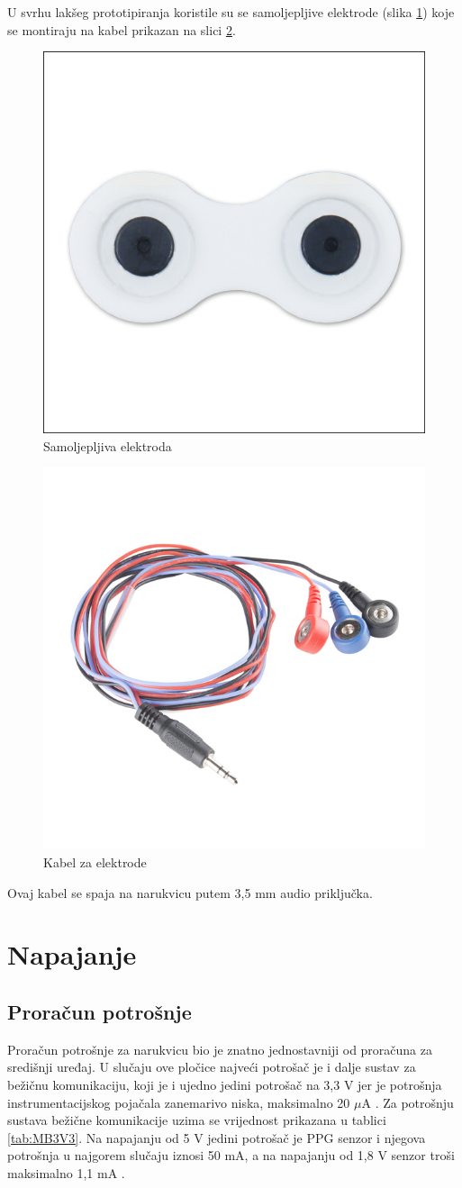 U svrhu lakšeg prototipiranja koristile su se samoljepljive elektrode (slika \ref{slk:ELECTRODE}) koje se montiraju na kabel prikazan na slici \ref{slk:CABLE}. 
\begin{figure}[htb]
    \centering
    \includegraphics[width=6 cm]{Figures/ELECTRODE-BOTTOM.jpg}
    \caption{Samoljepljiva elektroda \cite{electrode}}
    \label{slk:ELECTRODE}
\end{figure}
\begin{figure}
    \centering
    \includegraphics[width=6 cm]{Figures/CABLE.jpg}
    \caption{Kabel za elektrode}
    \label{slk:CABLE}
\end{figure}
Ovaj kabel se spaja na narukvicu putem 3,5 mm audio priključka.

\section{Napajanje}
\subsection{Proračun potrošnje}

Proračun potrošnje za narukvicu bio je znatno jednostavniji od proračuna za središnji uređaj. U slučaju ove pločice najveći potrošač je i dalje sustav za bežičnu komunikaciju, koji je i ujedno jedini potrošač na 3,3 V jer je potrošnja instrumentacijskog pojačala zanemarivo niska, maksimalno 20 $\mu\textrm{A}$ \cite{ad:ad8226}. Za potrošnju sustava bežične komunikacije uzima se vrijednost prikazana u tablici \ref{tab:MB3V3}. Na napajanju od 5 V jedini potrošač je PPG senzor i njegova potrošnja u najgorem slučaju iznosi 50 mA, a na napajanju od 1,8 V senzor troši maksimalno 1,1 mA \cite{ad:max30101}.

